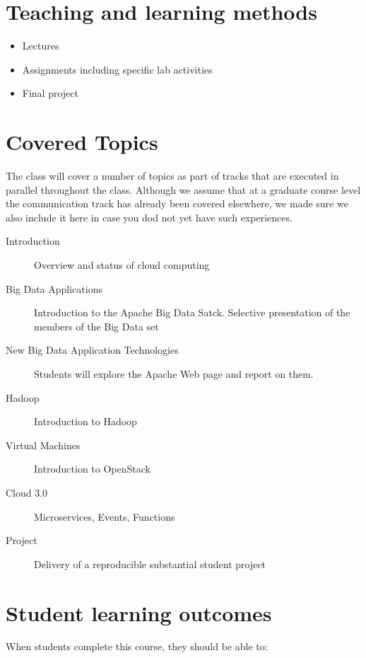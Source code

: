 \section{Teaching and learning methods}

\begin{itemize}
\item Lectures
\item Assignments including specific lab activities
\item Final project 
\end{itemize}

\section{Covered Topics}

The class will cover a number of topics as part of tracks that are
executed in parallel throughout the class. Although we assume that at
a graduate course level the communication track has already been
covered elsewhere, we made sure we also include it here in case you dod
not yet have such experiences.

\begin{description}

\item[Introduction] Overview and status of cloud computing
\item[Big Data Applications] Introduction to the Apache Big Data
  Satck. Selective presentation of the members of the Big Data set
\item[New Big Data Application Technologies] Students will
  explore the Apache Web page and report on them.
\item[Hadoop] Introduction to Hadoop
\item[Virtual Machines] Introduction to OpenStack
\item[Cloud 3.0] Microservices, Events, Functions  
\item[Project] Delivery of a reproducible substantial student project
 
\end{description}


\section{Student learning outcomes}

When students complete this course, they should be able to:

